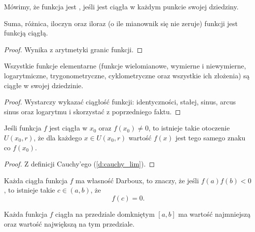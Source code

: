 Mówimy, że funkcja jest , jeśli jest ciągła w każdym punkcie swojej dziedziny.

\begin{fact}
    Suma, różnica, iloczyn oraz iloraz (o ile mianownik się nie zeruje) funkcji jest funkcją ciągłą.
\end{fact}
\begin{proof}
    Wynika z arytmetyki granic funkcji.
\end{proof}

\begin{fact}
    Wszystkie funkcje elementarne (funkcje wielomianowe, wymierne i niewymierne, logarytmiczne, trygonometryczne, cyklometryczne oraz wszystkie ich złożenia) są ciągłe w swojej dziedzinie.
\end{fact}
\begin{proof}
    Wystarczy wykazać ciągłość funkcji: identyczności, stałej, sinus, arcus sinus oraz logarytmu i skorzystać z poprzedniego faktu.
\end{proof}

\begin{theorem}
    Jeśli funkcja $f$ jest ciągła w $x_0$ oraz $f(x_0) \neq 0$, to istnieje takie otoczenie $U(x_0, r)$, że dla każdego $x \in U(x_0, r)$ wartość $f(x)$ jest tego samego znaku co $f(x_0)$.
\end{theorem}
\begin{proof}
    Z definicji Cauchy'ego (\ref{d:cauchy_lim}).
\end{proof}

\begin{theorem}
    Każda ciągła funkcja $f$ ma własność Darboux, to znaczy, że jeśli $f(a)f(b) < 0$, to istnieje takie $c \in (a, b)$, że
    \[ f(c) = 0. \]
\end{theorem}

\begin{theorem}
    \label{t:Weierstrass}
    Każda funkcja $f$ ciągła na przedziale domkniętym $[a, b]$ ma wartość najmniejszą oraz wartość największą na tym przedziale.
\end{theorem}
